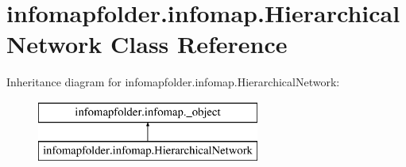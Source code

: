 \hypertarget{classinfomapfolder_1_1infomap_1_1HierarchicalNetwork}{}\section{infomapfolder.\+infomap.\+Hierarchical\+Network Class Reference}
\label{classinfomapfolder_1_1infomap_1_1HierarchicalNetwork}
Inheritance diagram for infomapfolder.\+infomap.\+Hierarchical\+Network\+:\begin{figure}[H]
\begin{center}
\leavevmode
\includegraphics[height=2.000000cm]{classinfomapfolder_1_1infomap_1_1HierarchicalNetwork}
\end{center}
\end{figure}
